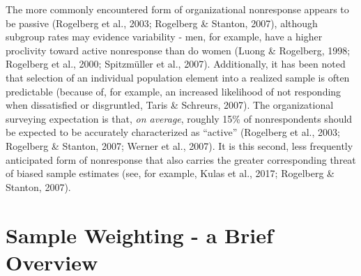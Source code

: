 \documentclass[
  man,mask]{apa7}
\begin{document}
The more commonly encountered form of organizational nonresponse appears to be passive (Rogelberg et al., 2003; Rogelberg \& Stanton, 2007), although subgroup rates may evidence variability - men, for example, have a higher proclivity toward active nonresponse than do women (Luong \& Rogelberg, 1998; Rogelberg et al., 2000; Spitzmüller et al., 2007). Additionally, it has been noted that selection of an individual population element into a realized sample is often predictable (because of, for example, an increased likelihood of not responding when dissatisfied or disgruntled, Taris \& Schreurs, 2007). The organizational surveying expectation is that, \emph{on average}, roughly 15\% of nonrespondents should be expected to be accurately characterized as ``active'' (Rogelberg et al., 2003; Rogelberg \& Stanton, 2007; Werner et al., 2007). It is this second, less frequently anticipated form of nonresponse that also carries the greater corresponding threat of biased sample estimates (see, for example, Kulas et al., 2017; Rogelberg \& Stanton, 2007).

\hypertarget{sample-weighting---a-brief-overview}{%
\section{Sample Weighting - a Brief Overview}\label{sample-weighting---a-brief-overview}}
\end{document}
